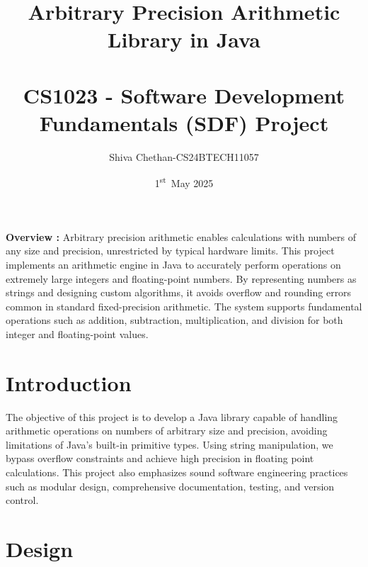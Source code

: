 \documentclass[12pt]{article}
\title{Arbitrary Precision Arithmetic Library in Java\\ \\
\large CS1023 - Software Development Fundamentals (SDF) Project}
\author{Shiva Chethan-CS24BTECH11057}
\date{1\textsuperscript{st}~May 2025}
\begin{document}
\maketitle
\noindent\textbf{Overview : }Arbitrary precision arithmetic enables calculations with numbers of any size and precision, unrestricted by typical hardware limits. This project implements an arithmetic engine in Java to accurately perform operations on extremely large integers and floating-point numbers. By representing numbers as strings and designing custom algorithms, it avoids overflow and rounding errors common in standard fixed-precision arithmetic. The system supports fundamental operations such as addition, subtraction, multiplication, and division for both integer and floating-point values. 

\tableofcontents
\newpage

\section{Introduction}
The objective of this project is to develop a Java library capable of handling arithmetic operations on numbers of arbitrary size and precision, avoiding limitations of Java's built-in primitive types. Using string manipulation, we bypass overflow constraints and achieve high precision in floating point calculations. This project also emphasizes sound software engineering practices such as modular design, comprehensive documentation, testing, and version control.

\section{Design}
\end{document}
